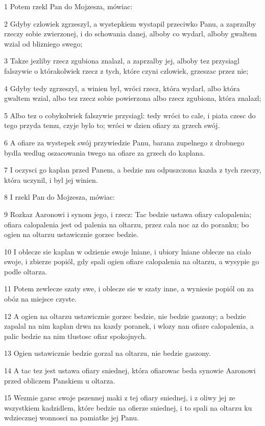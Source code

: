 \par 1 Potem rzekl Pan do Mojzesza, mówiac:
\par 2 Gdyby czlowiek zgrzeszyl, a wystepkiem wystapil przeciwko Panu, a zaprzalby rzeczy sobie zwierzonej, i do schowania danej, alboby co wydarl, alboby gwaltem wzial od blizniego swego;
\par 3 Takze jezliby rzecz zgubiona znalazl, a zaprzalby jej, alboby tez przysiagl falszywie o którakolwiek rzecz z tych, które czyni czlowiek, grzeszac przez nie;
\par 4 Gdyby tedy zgrzeszyl, a winien byl, wróci rzecz, która wydarl, albo która gwaltem wzial, albo tez rzecz sobie powierzona albo rzecz zgubiona, która znalazl;
\par 5 Albo tez o cobykolwiek falszywie przysiagl: tedy wróci to cale, i piata czesc do tego przyda temu, czyje bylo to; wróci w dzien ofiary za grzech swój.
\par 6 A ofiare za wystepek swój przywiedzie Panu, barana zupelnego z drobnego bydla wedlug oszacowania twego na ofiare za grzech do kaplana.
\par 7 I oczysci go kaplan przed Panem, a bedzie mu odpuszczona kazda z tych rzeczy, która uczynil, i byl jej winien.
\par 8 I rzekl Pan do Mojzesza, mówiac:
\par 9 Rozkaz Aaronowi i synom jego, i rzecz: Tac bedzie ustawa ofiary calopalenia; ofiara calopalenia jest od palenia na oltarzu, przez cala noc az do poranku; bo ogien na oltarzu ustawicznie gorzec bedzie.
\par 10 I oblecze sie kaplan w odzienie swoje lniane, i ubiory lniane oblecze na cialo swoje, i zbierze popiól, gdy spali ogien ofiare calopalenia na oltarzu, a wysypie go podle oltarza.
\par 11 Potem zewlecze szaty swe, i oblecze sie w szaty inne, a wyniesie popiól on za obóz na miejsce czyste.
\par 12 A ogien na oltarzu ustawicznie gorzec bedzie, nie bedzie gaszony; a bedzie zapalal na nim kaplan drwa na kazdy poranek, i wlozy nan ofiare calopalenia, a palic bedzie na nim tlustosc ofiar spokojnych.
\par 13 Ogien ustawicznie bedzie gorzal na oltarzu, nie bedzie gaszony.
\par 14 A tac tez jest ustawa ofiary sniednej, która ofiarowac beda synowie Aaronowi przed obliczem Panskiem u oltarza.
\par 15 Wezmie garsc swoje pszennej maki z tej ofiary sniednej, i z oliwy jej ze wszystkiem kadzidlem, które bedzie na ofierze sniednej, i to spali na oltarzu ku wdziecznej wonnosci na pamiatke jej Panu.
